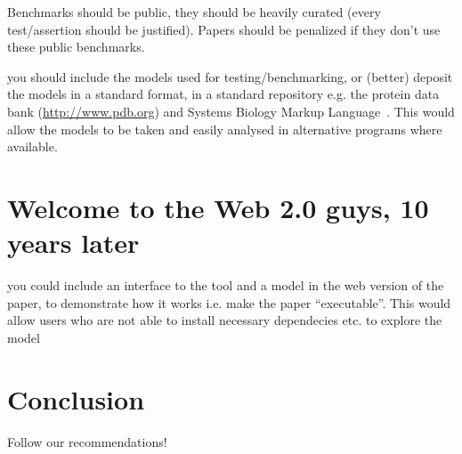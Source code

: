 \documentclass[conference]{IEEEtran}
\begin{document}
Benchmarks should be public, they should be heavily curated (every
test/assertion should be justified). Papers should be penalized if
they don't use these public benchmarks.

you should include the models used for testing/benchmarking, or
(better) deposit the models in a standard format, in a standard
repository e.g. the protein data bank (\url{http://www.pdb.org}) and
Systems Biology Markup Language~\cite{Hucka2003,Chaouiya2013}. This
would allow the models to be taken and easily analysed in alternative
programs where available.

\section{Welcome to the Web 2.0 guys, 10 years later} 

you could include an interface to the tool and a model in the web
version of the paper, to demonstrate how it works i.e. make the paper
``executable''. This would allow users who are not able to install
necessary dependecies etc. to explore the model \cite{Hall2014}




\section{Conclusion}
Follow our recommendations!




\end{document}
